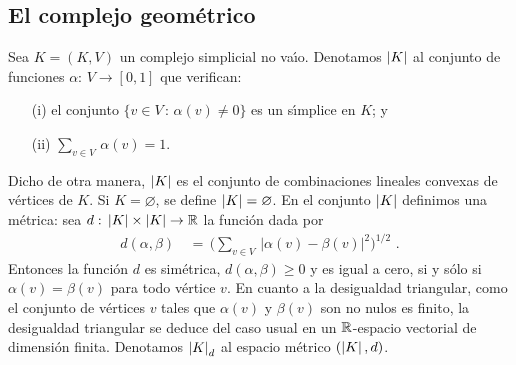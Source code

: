 \theoremstyle{plain}
\newtheorem{teoCompactoHausdorff}{Teorema}[section]
\newtheorem{teoTopologiaCoherente}[teoCompactoHausdorff]{Teorema}
\newtheorem{coroTopologiaCoherenteComplejos}[teoCompactoHausdorff]{Corolario}
\newtheorem{coroTopologiaCoherenteIdentidad}[teoCompactoHausdorff]{Corolario}
\newtheorem{propoRealizacionMorfismos}[teoCompactoHausdorff]{Proposici\'{o}n}
\newtheorem{coroTopologiaCoherenteSubcomplejos}[teoCompactoHausdorff]%
	{Corolario}

\theoremstyle{remark}
\newtheorem{obsTopologiaEnSimplices}[teoCompactoHausdorff]{Observaci\'{o}n}
\newtheorem{obsRealizacionMorfismos}[teoCompactoHausdorff]{Observaci\'{o}n}
\newtheorem{obsRealizacionUnionInterseccion}[teoCompactoHausdorff]%
	{Observaci\'{o}n}


\subsection{El complejo geom\'{e}trico}
Sea $K=(K,V)$ un complejo simplicial no va\'{\i}o. Denotamos $\left|K\right|$ al
conjunto de funciones $\alpha:\,V\rightarrow [0,1]$ que verifican:
\begin{itemize}
	\item[(i)] el conjunto $\{v\in V\,:\,\alpha(v)\not =0\}$ es un
		s\'{\i}mplice en $K$; y
	\item[(ii)] $\sum_{v\in V}\,\alpha(v)=1$.
\end{itemize}
%
Dicho de otra manera, $\left|K\right|$ es el conjunto de combinaciones lineales
convexas de v\'{e}rtices de $K$. Si $K=\varnothing$, se define
$\left|K\right|=\varnothing$. En el conjunto $\left|K\right|$ definimos una m\'{e}trica:
sea $d:\,\left|K\right|\times\left|K\right|\rightarrow\mathbb{R}$ la funci\'{o}n dada por
\begin{align*}
	d(\alpha,\beta) & \,=\,\Big(\sum_{v\in V}\,
				|\alpha(v)-\beta(v)|^{2}\Big)^{1/2}
	\text{ .}
\end{align*}
%
Entonces la funci\'{o}n $d$ es sim\'{e}trica, $d(\alpha,\beta)\geq 0$ y es
igual a cero, si y s\'{o}lo si $\alpha(v)=\beta(v)$ para todo v\'{e}rtice $v$.
En cuanto a la desigualdad triangular, como el conjunto de v\'{e}rtices
$v$ tales que $\alpha(v)$ y $\beta(v)$ son no nulos es finito, la
desigualdad triangular se deduce del caso usual en un $\mathbb{R}$-espacio
vectorial de dimensi\'{o}n finita. Denotamos $\left|K\right|_{d}$ al espacio
m\'{e}trico $(\left|K\right|,d)$.

